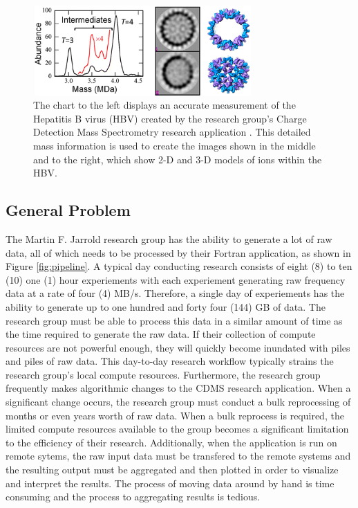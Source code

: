 \documentclass[9pt,twocolumn,twoside]{../../styles/osajnl}
\begin{document}
\begin{figure}[h]
\centering
\includegraphics[height=1.35in, width=3.3in]{images/hbvassembly}
\caption{The chart to the left displays an accurate measurement of the
  Hepatitis B virus (HBV) created by the research group's Charge
  Detection Mass Spectrometry research application \cite{247}. This
  detailed mass information is used to create the images shown in the
  middle and to the right, which show 2-D and 3-D models of ions
  within the HBV.}
\label{fig:hbvassembly}
\end{figure}

\subsection{General Problem} \label{problem}
The Martin F. Jarrold research group has the ability to generate a lot
of raw data, all of which needs to be processed by their Fortran
application, as shown in Figure \ref{fig:pipeline}. A typical day
conducting research consists of eight (8) to ten (10) one (1) hour
experiements with each experiement generating raw frequency data at a
rate of four (4) MB/s. Therefore, a single day of experiements has the
ability to generate up to one hundred and forty four (144) GB of
data. The research group must be able to process this data in a
similar amount of time as the time required to generate the raw
data. If their collection of compute resources are not powerful
enough, they will quickly become inundated with piles and piles of raw
data. This day-to-day research workflow typically strains the research
group's local compute resources. Furthermore, the research group
frequently makes algorithmic changes to the CDMS research
application. When a significant change occurs, the research group must
conduct a bulk reprocessing of months or even years worth of raw
data. When a bulk reprocess is required, the limited compute resources
available to the group becomes a significant limitation to the
efficiency of their research. Additionally, when the application is
run on remote sytems, the raw input data must be transfered to the
remote systems and the resulting output must be aggregated and then
plotted in order to visualize and interpret the results. The process
of moving data around by hand is time consuming and the process to
aggregating results is tedious.
\end{document}
